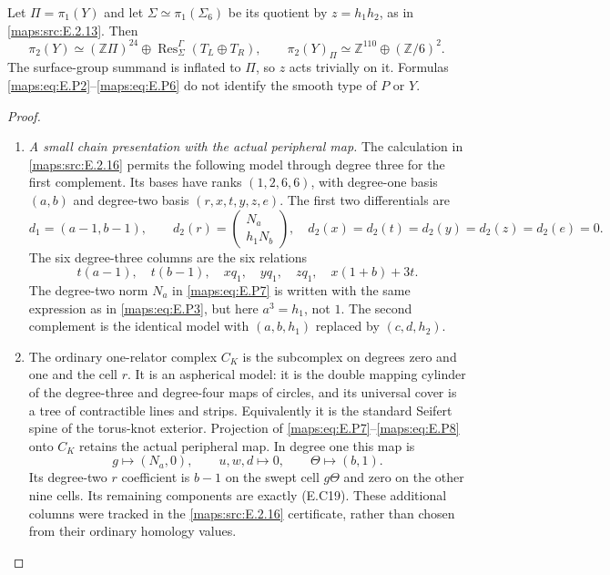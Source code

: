 \begin{theorem}
Let $\Pi=\pi_1(Y)$ and let $\Sigma\simeq\pi_1(\Sigma_6)$
be its quotient by $z=h_1h_2$, as in \ref{maps:src:E.2.13}. Then
\[
 \pi_2(Y)\simeq(\mathbb Z\Pi)^{24}
          \oplus\operatorname{Res}^{\Gamma}_{\Sigma}(T_L\oplus T_R),
 \qquad
 \pi_2(Y)_\Pi\simeq\mathbb Z^{110}\oplus(\mathbb Z/6)^2.
 \tag{E.P6}\label{maps:eq:E.P6}
\]
The surface-group summand is inflated to $\Pi$, so
$z$ acts trivially on it. Formulas \eqref{maps:eq:E.P2}--\eqref{maps:eq:E.P6}
do not identify the smooth type of $P$ or $Y$.

\end{theorem}


\begin{proof}
\begin{enumerate}[label=\arabic*.,leftmargin=*]
\item \emph{A small chain presentation with the actual peripheral map.}
The calculation in \ref{maps:src:E.2.16} permits the following model
through degree three for the first complement. Its
bases have ranks $(1,2,6,6)$, with degree-one basis
$(a,b)$ and degree-two basis $(r,x,t,y,z,e)$.
The first two differentials are
\[
 d_1=(a-1,b-1),\qquad
 d_2(r)=\begin{pmatrix}N_a\\h_1N_b\end{pmatrix},
 \quad d_2(x)=d_2(t)=d_2(y)=d_2(z)=d_2(e)=0.
 \tag{E.P7}\label{maps:eq:E.P7}
\]
The six degree-three columns are the six relations
\[
 t(a-1),\quad t(b-1),\quad xq_1,\quad yq_1,\quad zq_1,
                         \quad x(1+b)+3t.
 \tag{E.P8}\label{maps:eq:E.P8}
\]
The degree-two norm $N_a$ in \eqref{maps:eq:E.P7} is written with
the same expression as in \eqref{maps:eq:E.P3}, but here $a^3=h_1$,
not $1$. The second complement is the identical
model with $(a,b,h_1)$ replaced by $(c,d,h_2)$.

\item The ordinary one-relator complex $C_K$ is the subcomplex
on degrees zero and one and the cell $r$. It is an
aspherical model: it is the double mapping cylinder
of the degree-three and degree-four maps of circles,
and its universal cover is a tree of contractible
lines and strips. Equivalently it is the standard
Seifert spine of the torus-knot exterior. Projection
of \eqref{maps:eq:E.P7}--\eqref{maps:eq:E.P8} onto $C_K$ retains the actual
peripheral map. In degree one this map is
\[
 g\longmapsto(N_a,0),\qquad
 u,w,d\longmapsto0,\qquad
 \Theta\longmapsto(b,1).
 \tag{E.P9}\label{maps:eq:E.P9}
\]
Its degree-two $r$ coefficient is $b-1$ on the swept
cell $g\Theta$ and zero on the other nine cells.
Its remaining components are exactly (E.C19).
These additional columns were tracked in the
\ref{maps:src:E.2.16} certificate, rather than chosen from their
ordinary homology values.


\end{enumerate}
\end{proof}
